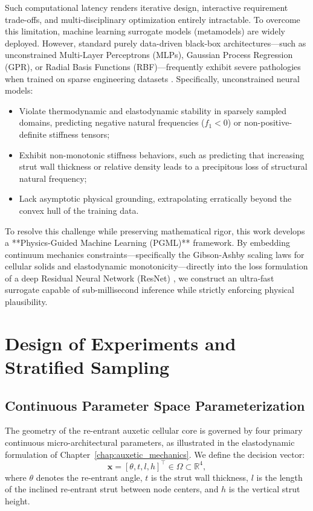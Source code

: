 Such computational latency renders iterative design, interactive requirement trade-offs, and multi-disciplinary optimization entirely intractable. To overcome this limitation, machine learning surrogate models (metamodels) are widely deployed. However, standard purely data-driven black-box architectures—such as unconstrained Multi-Layer Perceptrons (MLPs), Gaussian Process Regression (GPR), or Radial Basis Functions (RBF)—frequently exhibit severe pathologies when trained on sparse engineering datasets \cite{cui2025}. Specifically, unconstrained neural models:
\begin{itemize}
\item Violate thermodynamic and elastodynamic stability in sparsely sampled domains, predicting negative natural frequencies ($f_1 < 0$) or non-positive-definite stiffness tensors;
\item Exhibit non-monotonic stiffness behaviors, such as predicting that increasing strut wall thickness or relative density leads to a precipitous loss of structural natural frequency;
\item Lack asymptotic physical grounding, extrapolating erratically beyond the convex hull of the training data.
\end{itemize}

To resolve this challenge while preserving mathematical rigor, this work develops a **Physics-Guided Machine Learning (PGML)** framework. By embedding continuum mechanics constraints—specifically the Gibson-Ashby scaling laws for cellular solids \cite{gibson1997,beigrezaee2026} and elastodynamic monotonicity—directly into the loss formulation of a deep Residual Neural Network (ResNet) \cite{he2016}, we construct an ultra-fast surrogate capable of sub-millisecond inference while strictly enforcing physical plausibility.

\section{Design of Experiments and Stratified Sampling}
\label{sec:doe_sampling}

\subsection{Continuous Parameter Space Parameterization}

The geometry of the re-entrant auxetic cellular core is governed by four primary continuous micro-architectural parameters, as illustrated in the elastodynamic formulation of Chapter~\ref{chap:auxetic_mechanics}. We define the decision vector:
\begin{equation}
\mathbf{x} = [\theta, t, l, h]^\top \in \Omega \subset \mathbb{R}^4,
\label{eq:decision_vector}
\end{equation}
where $\theta$ denotes the re-entrant angle, $t$ is the strut wall thickness, $l$ is the length of the inclined re-entrant strut between node centers, and $h$ is the vertical strut height.

